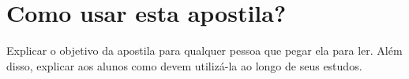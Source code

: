 \chapter*{Como usar esta apostila?}

Explicar o objetivo da apostila para qualquer pessoa que pegar ela para ler. Além disso, explicar aos alunos como devem utilizá-la ao longo de seus estudos.

